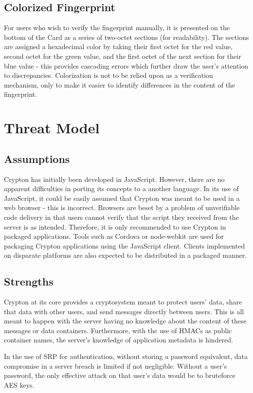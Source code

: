 \documentclass[conference]{IEEEtran}
\begin{document}
\subsection{Colorized Fingerprint}
For users who wish to verify the fingerprint manually, it is presented on the
bottom of the Card as a series of two-octet sections (for readability). The
sections are assigned a hexadecimal color by taking their first octet for the
red value, second octet for the green value, and the first octet of the next section
for their blue value - this provides cascading errors which further draw the user's
attention to discrepancies. Colorization is not to be relied upon as a verification
mechanism, only to make it easier to identify differences in the content of the
fingerprint.

\section{Threat Model}
\subsection{Assumptions}
Crypton has initially been developed in JavaScript. However, there are no
apparent difficulties in porting its concepts to a another language.
In its use of JavaScript, it could be easily assumed that Crypton was meant to
be used in a web browser - this is incorrect. Browsers are beset by a problem of
unverifiable code delivery in that users cannot verify that the script they received
from the server is as intended. Therefore, it is only recommended to use
Crypton in packaged applications. Tools such as Cordova\cite{cordova} or
node-webkit\cite{nodewebkit} are
used for packaging Crypton applications using the JavaScript client.
Clients implemented on disparate platforms are also expected to be distributed
in a packaged manner.

\subsection{Strengths}
Crypton at its core provides a cryptosystem meant to protect users' data,
share that data with other users, and send messages directly between users.
This is all meant to happen with the server having no knowledge about the content
of these messages or data containers. Furthermore, with the use of HMACs as public 
container names, the server's knowledge of application metadata is hindered.

In the use of SRP for authentication, without storing a password equivalent,
data compromise in a server breach is limited if not negligible. Without a user's
password, the only effective attack on that user's data would be to bruteforce
AES keys.
\end{document}
